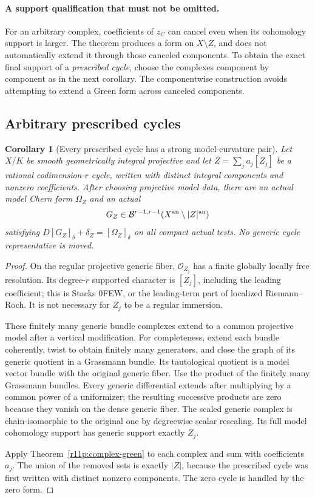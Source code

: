 \documentclass[11pt,a4paper]{article}
\newtheorem{corollary}[theorem]{Corollary}
\theoremstyle{definition}
\theoremstyle{remark}
\begin{document}
\paragraph*{A support qualification that must not be omitted.}
For an arbitrary complex, coefficients of $z_C$ can cancel even when
its cohomology support is larger.  The theorem produces a form on
$X\setminus Z$, and does not automatically extend it through those
canceled components.  To obtain the exact final support of a
\emph{prescribed cycle}, choose the complexes component by component
as in the next corollary. The componentwise construction avoids
attempting to extend a Green form across canceled components.

\subsection{Arbitrary prescribed cycles}

\begin{corollary}[Every prescribed cycle has a strong model-curvature pair]
\label{r11p:any-cycle-pair}
Let $X/K$ be smooth geometrically integral projective and let
$Z=\sum_j a_j[Z_j]$ be a rational codimension-$r$ cycle, written with
distinct integral components and nonzero coefficients.  After choosing
projective model data, there are an actual model Chern form $\Omega_Z$
and an actual
\[
                  G_Z\in\mathcal B^{r-1,r-1}
                           (X^{\rm an}\setminus|Z|^{\rm an})
\]
satisfying $D[G_Z]_\delta+\delta_Z=[\Omega_Z]_\delta$ on all compact
actual tests.  No generic cycle representative is moved.
\end{corollary}

\begin{proof}
On the regular projective generic fiber, $\mathcal O_{Z_j}$ has a
finite globally locally free resolution.  Its degree-$r$ supported
character is $[Z_j]$, including the leading coefficient; this is
Stacks 0FEW, or the leading-term part of localized Riemann--Roch.
It is not necessary for $Z_j$ to be a regular immersion.

These finitely many generic bundle complexes extend to a common
projective model after a vertical modification.  For completeness,
extend each bundle coherently, twist to obtain finitely many generators,
and close the graph of its generic quotient in a Grassmann bundle.
Its tautological quotient is a model vector bundle with the original
generic fiber.  Use the product of the finitely many Grassmann bundles.
Every generic differential extends after multiplying by a common
power of a uniformizer; the resulting successive products are zero
because they vanish on the dense generic fiber.  The scaled generic
complex is chain-isomorphic to the original one by degreewise scalar
rescaling.  Its full model cohomology support has generic support
exactly $Z_j$.

Apply Theorem~\ref{r11p:complex-green} to each complex and sum with
coefficients $a_j$.  The union of the removed sets is exactly
$|Z|$, because the prescribed cycle was first written with distinct
nonzero components.  The zero cycle is handled by the zero form.
\end{proof}
\end{document}
